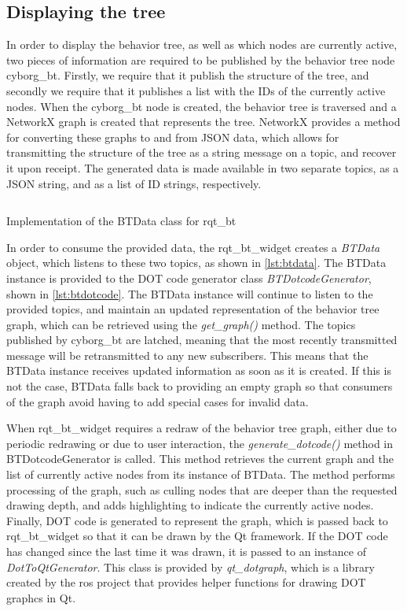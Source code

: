 \documentclass[\rootfolder/main.tex]{subfiles}
\begin{document}
\subsection{Displaying the tree}

In order to display the behavior tree, as well as which nodes are currently active, two pieces of information are required to be published by the behavior tree node cyborg\_bt.
Firstly, we require that it publish the structure of the tree, and secondly we require that it publishes a list with the IDs of the currently active nodes.
When the cyborg\_bt node is created, the behavior tree is traversed and a NetworkX graph is created that represents the tree.
NetworkX provides a method for converting these graphs to and from JSON data, which allows for transmitting the structure of the tree as a string message on a topic, and recover it upon receipt.
The generated data is made available in two separate topics, as a JSON string, and as a list of ID strings, respectively.

\begin{listing}
    \inputminted{python}{\rootfolder/Chapters/Chapter4/Listings/btdata.py}
    \caption{Implementation of the BTData class for rqt\_bt}
    \label{lst:btdata}
\end{listing}

In order to consume the provided data, the rqt\_bt\_widget creates a \emph{BTData} object, which listens to these two topics, as shown in \cref{lst:btdata}.
The BTData instance is provided to the DOT code generator class \emph{BTDotcodeGenerator}, shown in \cref{lst:btdotcode}.
The BTData instance will continue to listen to the provided topics, and maintain an updated representation of the behavior tree graph, which can be retrieved using the \emph{get\_graph()} method.
The topics published by cyborg\_bt are latched, meaning that the most recently transmitted message will be retransmitted to any new subscribers.
This means that the BTData instance receives updated information as soon as it is created.
If this is not the case, BTData falls back to providing an empty graph so that consumers of the graph avoid having to add special cases for invalid data.

When rqt\_bt\_widget requires a redraw of the behavior tree graph, either due to periodic redrawing or due to user interaction, the \emph{generate\_dotcode()} method in BTDotcodeGenerator is called.
This method retrieves the current graph and the list of currently active nodes from its instance of BTData.
The method performs processing of the graph, such as culling nodes that are deeper than the requested drawing depth, and adds highlighting to indicate the currently active nodes.
Finally, DOT code is generated to represent the graph, which is passed back to rqt\_bt\_widget so that it can be drawn by the Qt framework.
If the DOT code has changed since the last time it was drawn, it is passed to an instance of \emph{DotToQtGenerator}.
This class is provided by \emph{qt\_dotgraph}, which is a library created by the \acrshort{ros} project that provides helper functions for drawing DOT graphcs in Qt.
\end{document}
